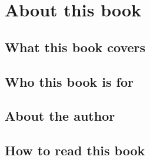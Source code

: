 \chapter{About this book}

\section{What this book covers}

\section{Who this book is for}

\section{About the author}

\section{How to read this book}
